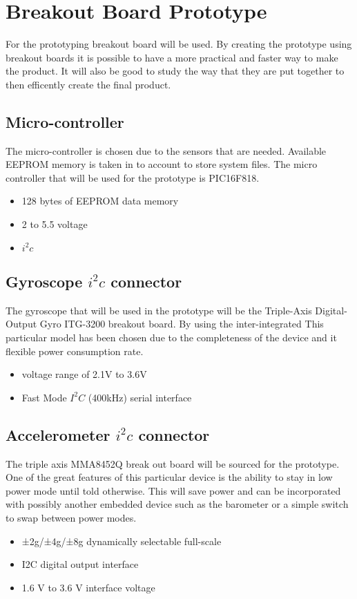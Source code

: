 \documentclass{report}
\begin{document}
\section{Breakout Board Prototype}
For the prototyping breakout board will be used. By creating the prototype using breakout boards it is possible to have a more practical and faster way to make the product. It will also be good to study the way that they are put together to then efficently create the final product.
 
\subsection{Micro-controller}
The micro-controller is chosen due to the sensors that are needed. Available EEPROM memory is taken in to account to store system files. The micro controller that will be used for the prototype is PIC16F818. 
\begin{itemize}
\item 128 bytes of EEPROM data memory
\item 2 to 5.5 voltage
\item $i^2c$
\end{itemize}

\subsection{Gyroscope $i^2c$ connector}
The gyroscope that will be used in the prototype will be the Triple-Axis Digital-Output Gyro ITG-3200 breakout board. By using the inter-integrated 
This particular model has been chosen due to the completeness of the device and it flexible power consumption rate.
\begin{itemize}
\item voltage range of 2.1V to 3.6V
\item Fast Mode $I^2C$ (400kHz) serial interface
\end{itemize}
\subsection{Accelerometer $i^2c$ connector}
The triple axis MMA8452Q break out board will be sourced for the prototype. One of the great features of this particular device is the ability to stay in low power mode until told otherwise. This will save power and can be incorporated with possibly another embedded device such as the barometer or a simple switch to swap between power modes.
\begin{itemize}
\item ±2g/±4g/±8g dynamically selectable full-scale
\item I2C digital output interface
\item 1.6 V to 3.6 V interface voltage
\end{itemize}
\end{document}
